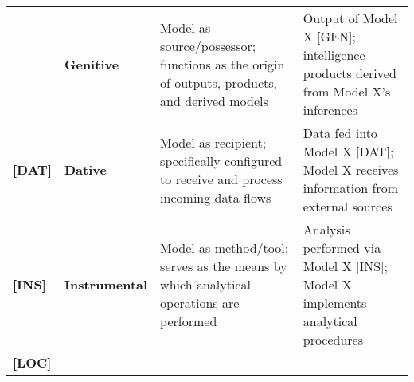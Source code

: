 \begin{longtable}[]{@{}llll@{}}
\begin{minipage}[t]{0.11\columnwidth}
\end{minipage} & \begin{minipage}[t]{0.11\columnwidth}\raggedright
\textbf{Genitive}\strut
\end{minipage} & \begin{minipage}[t]{0.40\columnwidth}\raggedright
Model as source/possessor; functions as the origin of outputs, products,
and derived models\strut
\end{minipage} & \begin{minipage}[t]{0.27\columnwidth}\raggedright
Output of Model X {[}GEN{]}; intelligence products derived from Model
X's inferences\strut
\end{minipage}\tabularnewline
\begin{minipage}[t]{0.11\columnwidth}\raggedright
\textbf{{[}DAT{]}}\strut
\end{minipage} & \begin{minipage}[t]{0.11\columnwidth}\raggedright
\textbf{Dative}\strut
\end{minipage} & \begin{minipage}[t]{0.40\columnwidth}\raggedright
Model as recipient; specifically configured to receive and process
incoming data flows\strut
\end{minipage} & \begin{minipage}[t]{0.27\columnwidth}\raggedright
Data fed into Model X {[}DAT{]}; Model X receives information from
external sources\strut
\end{minipage}\tabularnewline
\begin{minipage}[t]{0.11\columnwidth}\raggedright
\textbf{{[}INS{]}}\strut
\end{minipage} & \begin{minipage}[t]{0.11\columnwidth}\raggedright
\textbf{Instrumental}\strut
\end{minipage} & \begin{minipage}[t]{0.40\columnwidth}\raggedright
Model as method/tool; serves as the means by which analytical operations
are performed\strut
\end{minipage} & \begin{minipage}[t]{0.27\columnwidth}\raggedright
Analysis performed via Model X {[}INS{]}; Model X implements analytical
procedures\strut
\end{minipage}\tabularnewline
\begin{minipage}[t]{0.11\columnwidth}\raggedright
\textbf{{[}LOC{]}}\strut
\end{minipage} & \begin{minipage}[t]{0.11\columnwidth}\raggedright

\end{minipage}
\end{longtable}
